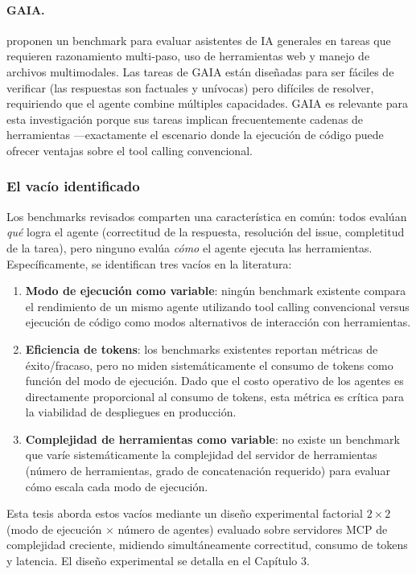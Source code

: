 \paragraph{GAIA.} \citet{gaia2024} proponen un benchmark para evaluar
asistentes de IA generales en tareas que requieren razonamiento multi-paso,
uso de herramientas web y manejo de archivos multimodales. Las tareas de GAIA
están diseñadas para ser fáciles de verificar (las respuestas son factuales y
unívocas) pero difíciles de resolver, requiriendo que el agente combine
múltiples capacidades. GAIA es relevante para esta investigación porque sus
tareas implican frecuentemente cadenas de herramientas ---exactamente el
escenario donde la ejecución de código puede ofrecer ventajas sobre el tool
calling convencional.

\subsubsection{El vacío identificado}

Los benchmarks revisados comparten una característica en común: todos evalúan
\textit{qué} logra el agente (correctitud de la respuesta, resolución del
issue, completitud de la tarea), pero ninguno evalúa \textit{cómo} el agente
ejecuta las herramientas. Específicamente, se identifican tres vacíos en la
literatura:

\begin{enumerate}
    \item \textbf{Modo de ejecución como variable}: ningún benchmark existente
    compara el rendimiento de un mismo agente utilizando tool calling
    convencional versus ejecución de código como modos alternativos de
    interacción con herramientas.

    \item \textbf{Eficiencia de tokens}: los benchmarks existentes reportan
    métricas de éxito/fracaso, pero no miden sistemáticamente el consumo de
    tokens como función del modo de ejecución. Dado que el costo operativo de
    los agentes es directamente proporcional al consumo de tokens, esta métrica
    es crítica para la viabilidad de despliegues en producción.

    \item \textbf{Complejidad de herramientas como variable}: no existe un
    benchmark que varíe sistemáticamente la complejidad del servidor de
    herramientas (número de herramientas, grado de concatenación requerido) para
    evaluar cómo escala cada modo de ejecución.
\end{enumerate}

Esta tesis aborda estos vacíos mediante un diseño experimental factorial $2
\times 2$ (modo de ejecución $\times$ número de agentes) evaluado sobre
servidores MCP de complejidad creciente, midiendo simultáneamente correctitud,
consumo de tokens y latencia. El diseño experimental se detalla en el Capítulo
3.
